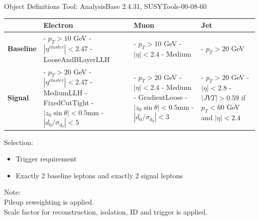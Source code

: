\documentclass[mathserif,serif]{beamer}
\begin{document}
\begin{frame}{Object Definitions}
\small
Tool: AnalysisBase 2.4.31, SUSYTools-00-08-60\\

\centering
\begin{table}
\small
\begin{tabularx}{\textwidth}{p{1.5cm} | p{3cm} | p{3cm} | p{3cm}}
& \textbf{Electron} & \textbf{Muon} & \textbf{Jet}\\
\hline
\textbf{Baseline}
& - $p_T>10$ GeV \newline - $|\eta^{cluster}| < 2.47$ \newline - LooseAndBLayerLLH
& - $p_T>10$ GeV \newline - $|\eta| < 2.4$ \newline - Medium
& - $p_T>20$ GeV \\
\hline
\textbf{Signal}
& - $p_T > 20$ GeV \newline - $|\eta^{cluster}| < 2.47$ \newline - MediumLLH \newline - FixedCutTight \newline - $|z_0 \sin \theta| < 0.5$mm \newline - $|d_0/\sigma_{d_0}| < 5$
& - $p_T > 20$ GeV \newline - $|\eta| < 2.4$ \newline - Medium \newline - GradientLoose \newline - $|z_0 \sin \theta| < 0.5$mm \newline - $|d_0/\sigma_{d_0}| < 3$
& - $p_T > 20$ GeV \newline - $|\eta|<2.8$ \newline \newline - $|JVT| > 0.59$ \newline if $p_T < 60$ GeV \newline and $|\eta| < 2.4$
\end{tabularx}
\end{table}

\raggedright
Selection:
\begin{itemize}
\item Trigger requirement
\item Exactly 2 baseline leptons and exactly 2 signal leptons
\end{itemize}

\tiny
Note: \\
Pileup reweighting is applied. \\
Scale factor for reconstruction, isolation, ID and trigger is applied.
\end{frame}
\end{document}
